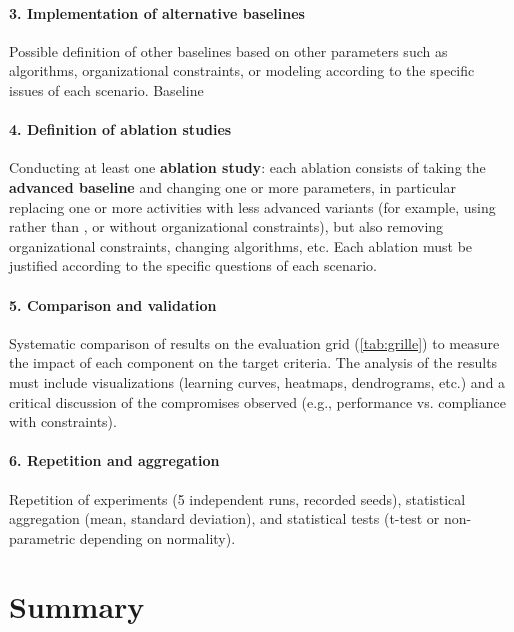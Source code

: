\paragraph{3. Implementation of alternative baselines}
Possible definition of other baselines based on other parameters such as  algorithms, organizational constraints, or modeling according to the specific issues of each scenario. Baseline

\paragraph{4. Definition of ablation studies}
Conducting at least one \textbf{ablation study}: each ablation consists of taking the \textbf{advanced baseline} and changing one or more parameters, in particular replacing one or more  activities with less advanced variants (for example,  using  rather than , or  without organizational constraints), but also removing organizational constraints, changing algorithms, etc. Each ablation must be justified according to the specific questions of each scenario.

\paragraph{5. Comparison and validation}
Systematic comparison of results on the evaluation grid (\autoref{tab:grille}) to measure the impact of each component on the target criteria. The analysis of the results must include visualizations (learning curves, heatmaps, dendrograms, etc.) and a critical discussion of the compromises observed (e.g., performance vs. compliance with constraints).

\paragraph{6. Repetition and aggregation}
Repetition of experiments (5 independent runs, recorded seeds), statistical aggregation (mean, standard deviation), and statistical tests (t-test or non-parametric depending on normality).


\section {Summary}


